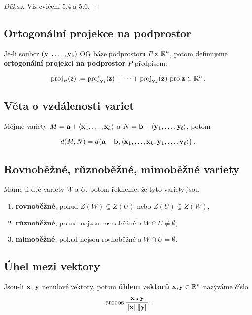 \begin{proof}[Důkaz]
	Viz cvičení 5.4 a 5.6.
\end{proof}

\subsection*{Ortogonální projekce na podprostor}

Je-li soubor $(\mathbf{y}_1,\dots,\mathbf{y}_k)$ OG báze podprostoru $P$ z $\mathbb{R}^n$, potom definujeme \textbf{ortogonální projekci na podprostor} $P$ předpisem:

\begin{equation*}
	\text{proj}_P(\mathbf{z}):=\text{proj}_{\mathbf{y}_1}(\mathbf{z})+\dots +\text{proj}_{\mathbf{y}_k}(\mathbf{z}) \text{ pro }\mathbf{z}\in \mathbb{R}^n\,.
\end{equation*}

\subsection*{Věta o vzdálenosti variet}

Mějme variety $M=\mathbf{a}+\langle \mathbf{x}_1,\dots,\mathbf{x}_k\rangle$ a $N=\mathbf{b}+\langle\mathbf{y}_1,\dots,\mathbf{y}_\ell\rangle$, potom

\[ d(M,N)=d\big(\mathbf{a}-\mathbf{b},\langle \mathbf{x}_1,\dots,\mathbf{x}_k,\mathbf{y}_1,\dots,\mathbf{y}_\ell\rangle\big)\,. \]

\subsection*{Rovnoběžné, různoběžné, mimoběžné variety}

Máme-li dvě variety $W$ a $U$, potom řekneme, že tyto variety jsou

\begin{enumerate}
	\item \textbf{rovnoběžné}, pokud $Z(W)\subseteq Z(U)$ nebo $Z(U)\subseteq Z(W)$,
	\item \textbf{různoběžné}, pokud nejsou rovnoběžné a $W\cap U\neq \emptyset$,
	\item \textbf{mimoběžné}, pokud nejsou rovnoběžné a $W\cap U= \emptyset$.
\end{enumerate}

\subsection*{Úhel mezi vektory}

Jsou-li $\mathbf{x}$, $\mathbf{y}$ nenulové vektory, potom \textbf{úhlem vektorů} $\mathbf{x},\mathbf{y}\in \mathbb{R}^n$ nazýváme číslo
\[ \arccos\frac{\mathbf{x}\centerdot \mathbf{y}}{\|\mathbf{x}\|\|\mathbf{y}\|}. \]

